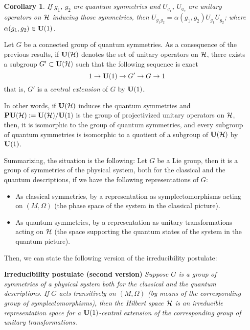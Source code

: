 \documentclass[12pt]{article}
\theoremstyle{plain}
\newtheorem{corol}{Corollary}
\def\H{{\cal H}}
\begin{document}
\begin{corol}
If $g_1$, $g_2$ are quantum symmetries and
$U_{g_1}$, $U_{g_2}$ are unitary operators on $\H$
inducing those symmetries, then
$U_{g_1g_2}=\alpha (g_1,g_2)U_{g_1}U_{g_2}$;
where $\alpha (g_1,g_2) \in {\bf U}(1)$.
\end{corol}

Let $G$ be a connected group of quantum symmetries.
As a consequence of the previous results, if ${\bf U}(\H )$ denotes
the set of unitary operators on $\H$, there exists a subgroup
$G'\subset {\bf U}(\H )$ such that the following sequence is exact
$$
1 \to {\bf U}(1) \to G' \to G \to 1
$$
that is, $G'$ is a {\it central extension} of $G$ by ${\bf U}(1)$.

In other words, if ${\bf U}(\H )$ induces the quantum symmetries
and ${\bf PU}(\H ):={\bf U}(\H )/{\bf U}(1)$ is the group of
projectivized
unitary operators on $\H$, then, it is isomorphic to the group of
quantum symmetries, and every subgroup of quantum symmetries
is isomorphic to a quotient of a subgroup of ${\bf U}(\H )$ by ${\bf
U}(1)$.

Summarizing, the situation is the following:
Let $G$ be a Lie group, then it is a group of symmetries of the
physical system, both for the classical and the quantum descriptions,
if we have the following representations of $G$:
\begin{itemize}
\item
As classical symmetries, by a representation as symplectomorphisms
acting on $(M,\Omega )$ (the phase space of the system in the classical
picture).
\item
As quantum symmetries, by a representation as unitary transformations
acting on $\H$
(the space supporting the quantum states of the system in the quantum
picture).
\end{itemize}
Then, we can state the following version of the
irreducibility postulate:
\medskip

\noindent
{\bf Irreducibility postulate (second version)}
{\it Suppose $G$ is a group of symmetries of a physical system
both for the classical and the quantum descriptions.
If $G$ acts transitively on $(M, \Omega )$
(by means of the corresponding group of symplectomorphisms),
then the Hilbert space $\H$ is an irreducible representation space
for a ${\bf U}(1)$-central extension of the corresponding
group of unitary transformations.
}
\end{document}
